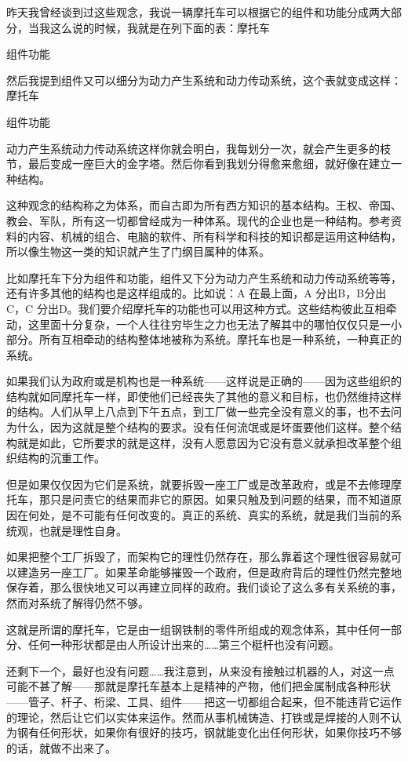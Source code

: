 \documentclass[UTF8]{article}
\begin{document}
\par 昨天我曾经谈到过这些观念，我说一辆摩托车可以根据它的组件和功能分成两大部分，当我这么说的时候，我就是在列下面的表：摩托车
\par 组件功能
\par 然后我提到组件又可以细分为动力产生系统和动力传动系统，这个表就变成这样：摩托车
\par 组件功能
\par 动力产生系统动力传动系统这样你就会明白，我每划分一次，就会产生更多的枝节，最后变成一座巨大的金字塔。然后你看到我划分得愈来愈细，就好像在建立一种结构。
\par 这种观念的结构称之为体系，而自古即为所有西方知识的基本结构。王权、帝国、教会、军队，所有这一切都曾经成为一种体系。现代的企业也是一种结构。参考资料的内容、机械的组合、电脑的软件、所有科学和科技的知识都是运用这种结构，所以像生物这一类的知识就产生了门纲目属种的体系。
\par 比如摩托车下分为组件和功能，组件又下分为动力产生系统和动力传动系统等等，还有许多其他的结构也是这样组成的。比如说：A 在最上面，A 分出B，B分出C，C 分出D。我们要介绍摩托车的功能也可以用这种方式。这些结构彼此互相牵动，这里面十分复杂，一个人往往穷毕生之力也无法了解其中的哪怕仅仅只是一小部分。所有互相牵动的结构整体地被称为系统。摩托车也是一种系统，一种真正的系统。
\par 如果我们认为政府或是机构也是一种系统——这样说是正确的——因为这些组织的结构就如同摩托车一样，即使他们已经丧失了其他的意义和目标，也仍然维持这样的结构。人们从早上八点到下午五点，到工厂做一些完全没有意义的事，也不去问为什么，因为这就是整个结构的要求。没有任何流氓或是坏蛋要他们这样。整个结构就是如此，它所要求的就是这样，没有人愿意因为它没有意义就承担改革整个组织结构的沉重工作。
\par 但是如果仅仅因为它们是系统，就要拆毁一座工厂或是改革政府，或是不去修理摩托车，那只是问责它的结果而非它的原因。如果只触及到问题的结果，而不知道原因在何处，是不可能有任何改变的。真正的系统、真实的系统，就是我们当前的系统观，也就是理性自身。
\par 如果把整个工厂拆毁了，而架构它的理性仍然存在，那么靠着这个理性很容易就可以建造另一座工厂。如果革命能够摧毁一个政府，但是政府背后的理性仍然完整地保存着，那么很快地又可以再建立同样的政府。我们谈论了这么多有关系统的事，然而对系统了解得仍然不够。
\par 这就是所谓的摩托车，它是由一组钢铁制的零件所组成的观念体系，其中任何一部分、任何一种形状都是由人所设计出来的……第三个梃杆也没有问题。
\par 还剩下一个，最好也没有问题……我注意到，从来没有接触过机器的人，对这一点可能不甚了解——那就是摩托车基本上是精神的产物，他们把金属制成各种形状——管子、杆子、桁梁、工具、组件——把这一切都组合起来，但不能违背它运作的理论，然后让它们以实体来运作。然而从事机械铸造、打铁或是焊接的人则不认为钢有任何形状，如果你有很好的技巧，钢就能变化出任何形状，如果你技巧不够的话，就做不出来了。
\end{document}
